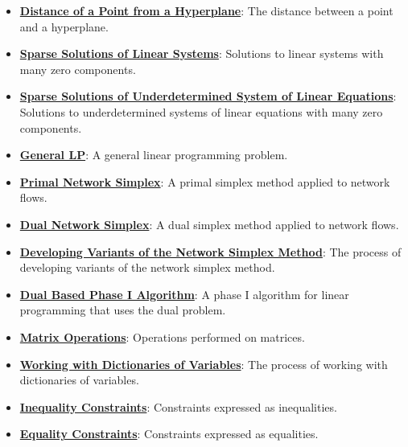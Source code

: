 \documentclass{article}%
\begin{document}
\begin{itemize}[leftmargin=*]
\item \href{https://www.math.purdue.edu/~yipn/421/2024-11-14-NetAppls.pdf#page=7}{\textbf{Distance of a Point from a Hyperplane}}: The distance between a point and a hyperplane.%
\item \href{https://www.math.purdue.edu/~yipn/421/2024-11-14-NetAppls.pdf#page=7}{\textbf{Sparse Solutions of Linear Systems}}: Solutions to linear systems with many zero components.%
\item \href{https://www.math.purdue.edu/~yipn/421/2024-11-14-NetAppls.pdf#page=7}{\textbf{Sparse Solutions of Underdetermined System of Linear Equations}}: Solutions to underdetermined systems of linear equations with many zero components.%
\item \href{https://www.math.purdue.edu/~yipn/421/2024-11-14-NetAppls.pdf#page=7}{\textbf{General LP}}: A general linear programming problem.%
\item \href{https://www.math.purdue.edu/~yipn/421/2024-11-14-NetAppls.pdf#page=7}{\textbf{Primal Network Simplex}}: A primal simplex method applied to network flows.%
\item \href{https://www.math.purdue.edu/~yipn/421/2024-11-14-NetAppls.pdf#page=7}{\textbf{Dual Network Simplex}}: A dual simplex method applied to network flows.%
\item \href{https://www.math.purdue.edu/~yipn/421/2024-11-14-NetAppls.pdf#page=7}{\textbf{Developing Variants of the Network Simplex Method}}: The process of developing variants of the network simplex method.%
\item \href{https://www.math.purdue.edu/~yipn/421/2024-11-14-NetAppls.pdf#page=7}{\textbf{Dual Based Phase I Algorithm}}: A phase I algorithm for linear programming that uses the dual problem.%
\item \href{https://www.math.purdue.edu/~yipn/421/2024-11-14-NetAppls.pdf#page=7}{\textbf{Matrix Operations}}: Operations performed on matrices.%
\item \href{https://www.math.purdue.edu/~yipn/421/2024-11-14-NetAppls.pdf#page=7}{\textbf{Working with Dictionaries of Variables}}: The process of working with dictionaries of variables.%
\item \href{https://www.math.purdue.edu/~yipn/421/2024-11-14-NetAppls.pdf#page=7}{\textbf{Inequality Constraints}}: Constraints expressed as inequalities.%
\item \href{https://www.math.purdue.edu/~yipn/421/2024-11-14-NetAppls.pdf#page=7}{\textbf{Equality Constraints}}: Constraints expressed as equalities.%

\end{itemize}
\end{document}
